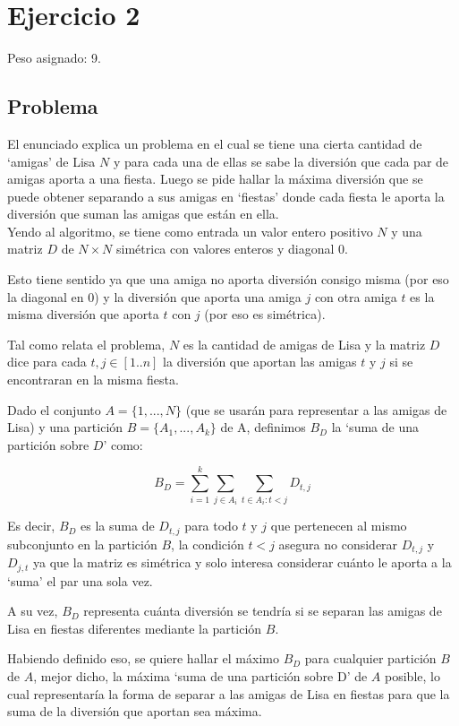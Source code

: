 \section{Ejercicio 2}

Peso asignado: 9.
\subsection{Problema}
El enunciado explica un problema en el cual se tiene una cierta cantidad de
`amigas' de Lisa $N$ y para cada una de ellas se sabe la diversión que cada par
de amigas aporta a una fiesta. Luego se pide hallar la máxima diversión que se
puede obtener separando a sus amigas en `fiestas' donde cada fiesta le aporta la
diversión que suman las amigas que están en ella. \\ Yendo al algoritmo, se
tiene como entrada un valor entero positivo $N$ y una
matriz $D$ de $N \times N$ simétrica con valores enteros y diagonal 0.

Esto tiene sentido ya que una amiga no aporta diversión consigo misma (por eso
la diagonal en 0) y la diversión que aporta una amiga $j$ con otra amiga $t$ es
la misma diversión que aporta $t$ con $j$ (por eso es simétrica).

Tal como relata el problema, $N$ es la cantidad de amigas de Lisa y la matriz
$D$ dice para cada $t,j \in [1..n]$ la diversión que aportan las amigas $t$
y $j$ si se encontraran en la misma fiesta.

Dado el conjunto $A = \{1,...,N\}$ (que se usarán para representar a las amigas
de Lisa) y una partición $B = \{A_1,...,A_k\}$ de A, definimos $B_D$ la `suma de
una partición sobre $D$' como:

\begin{equation*}
    B_D = \sum_{i=1}^{k}{\sum_{j \in A_i}^{}{\sum_{t \in A_i : t < j}^{}{D_{t,j}}}}
\end{equation*}

Es decir, $B_D$ es la suma de $D_{t,j}$ para todo $t$ y $j$ que pertenecen al
mismo subconjunto en la partición $B$, la condición $t < j$ asegura no
considerar $D_{t,j}$ y $D_{j,t}$ ya que la matriz es simétrica y solo
interesa considerar cuánto le aporta a la `suma' el par una sola vez.

A su vez, $B_D$ representa cuánta diversión se tendría si se separan las
amigas de Lisa en fiestas diferentes mediante la partición $B$.

Habiendo definido eso, se quiere hallar el máximo $B_D$ para cualquier partición
$B$ de $A$, mejor dicho, la máxima `suma de una partición sobre D' de $A$
posible, lo cual representaría la forma de separar a las amigas de Lisa en
fiestas para que la suma de la diversión que aportan sea máxima.

